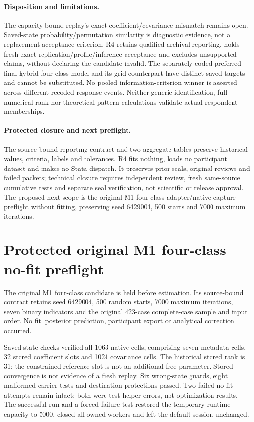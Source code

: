 \documentclass[11pt,a4paper]{article}
\begin{document}
\paragraph{Disposition and limitations.}
The capacity-bound replay's exact coefficient/covariance mismatch remains open.
Saved-state probability/permutation similarity is diagnostic evidence, not a
replacement acceptance criterion. R4 retains qualified archival reporting, holds
fresh exact-replication/profile/inference acceptance and excludes unsupported claims,
without declaring the candidate invalid. The separately coded preferred final
hybrid four-class model and its grid counterpart have distinct saved targets and
cannot be substituted. No pooled information-criterion winner is asserted across
different recoded response events. Neither generic identification, full numerical
rank nor theoretical pattern calculations validate actual respondent memberships.
\paragraph{Protected closure and next preflight.}
The source-bound reporting contract and two aggregate tables preserve historical
values, criteria, labels and tolerances. R4 fits nothing, loads no participant dataset
and makes no Stata dispatch. It preserves prior seals, original reviews and failed
packets; technical closure requires independent review, fresh same-source cumulative
tests and separate seal verification, not scientific or release approval.
The proposed next scope is the original M1 four-class adapter/native-capture preflight
without fitting, preserving seed 6429004, 500 starts and 7000 maximum iterations.

\section{Protected original M1 four-class no-fit preflight}
The original M1 four-class candidate is held before estimation. Its source-bound
contract retains seed 6429004, 500 random starts, 7000 maximum iterations, seven
binary indicators and the original 423-case complete-case sample and input order.
No fit, posterior prediction, participant export or analytical correction occurred.

Saved-state checks verified all 1063 native cells, comprising seven metadata cells,
32 stored coefficient slots and 1024 covariance cells. The historical stored rank
is 31; the constrained reference slot is not an additional free parameter.
Stored convergence is not evidence of a fresh replay. Six wrong-state guards,
eight malformed-carrier tests and destination protections passed. Two failed
no-fit attempts remain intact; both were test-helper errors, not optimization
results. The successful run and a forced-failure test restored the temporary
runtime capacity to 5000, closed all owned workers and left the default session
unchanged.
\end{document}
